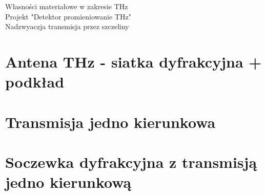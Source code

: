 

Własności materiałowe w zakresie THz\\
Projekt "Detektor promieniowanie THz"\\
Nadzwyaczja transmisja przez szczeliny\\

\section{Antena THz - siatka dyfrakcyjna + podkład}


\section{Transmisja jedno kierunkowa}
\section{Soczewka dyfrakcyjna z transmisją jedno kierunkową}
